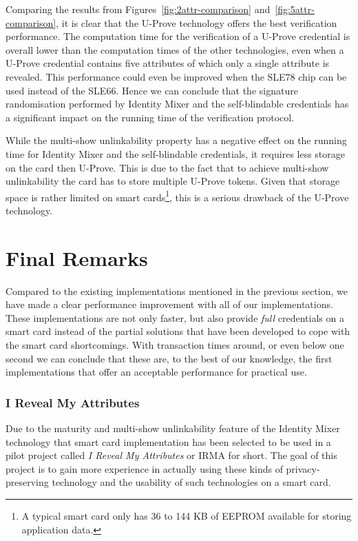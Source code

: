 Comparing the results from Figures~\ref{fig:2attr-comparison}
and~\ref{fig:5attr-comparison}, it is clear that the U-Prove technology offers
the best verification performance. The computation time for the verification of
a U-Prove credential is overall lower than the computation times of the other
technologies, even when a U-Prove credential contains five attributes of which
only a single attribute is revealed. This performance could even be improved
when the SLE78 chip can be used instead of the SLE66. Hence we can conclude that
the signature randomisation performed by Identity Mixer and the self-blindable
credentials has a significant impact on the running time of the verification
protocol.

While the multi-show unlinkability property has a negative effect on the running
time for Identity Mixer and the self-blindable credentials, it requires less
storage on the card then U-Prove. This is due to the fact that to achieve
multi-show unlinkability the card has to store multiple U-Prove tokens. Given
that storage space is rather limited on smart cards\footnote{A typical smart
card only has 36 to 144 KB of EEPROM available for storing application data.},
this is a serious drawback of the U-Prove technology.

\section{Final Remarks}

Compared to the existing implementations mentioned in the previous section, we
have made a clear performance improvement with all of our implementations. These
implementations are not only faster, but also provide \emph{full} credentials
on a smart card instead of the partial solutions that have been developed to
cope with the smart card shortcomings. With transaction times around, or even
below one second we can conclude that these are, to the best of our knowledge,
the first implementations that offer an acceptable performance for practical
use.

\subsubsection{I Reveal My Attributes}

Due to the maturity and multi-show unlinkability feature of the Identity Mixer
technology that smart card implementation has been selected to be used in a
pilot project called \emph{I Reveal My Attributes} or IRMA for short. The goal
of this project is to gain more experience in actually using these kinds of
privacy-preserving technology and the usability of such technologies on a smart
card.